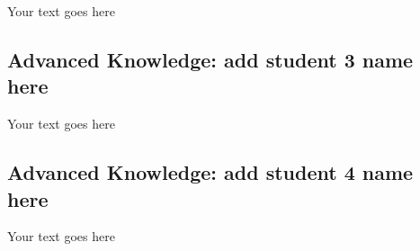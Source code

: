 \documentclass[a4paper, 11pt]{report}
\begin{document}
Your text goes here

\subsection{Advanced Knowledge: add student 3 name here}

Your text goes here

\subsection{Advanced Knowledge: add student 4 name here}

Your text goes here




\newpage



\end{document}
